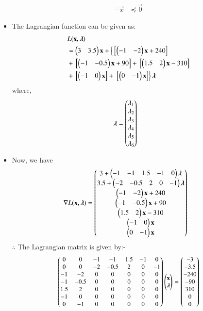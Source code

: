 \documentclass[journal,12pt,twocolumn]{IEEEtran}
\begin{document}
\begin{itemize}
\begin{align}
        \vec{-x} &\preceq \vec{0}
\end{align}
\item The Lagrangian function can be given as:
\begin{equation}
\begin{aligned}
    &L(\mathbf{x},\boldsymbol{\lambda}) \\ &= \begin{pmatrix}3 & 3.5\end{pmatrix}\mathbf{x}+\left\{{}\left[\begin{pmatrix}-1 & -2\end{pmatrix}\mathbf{x}+240\right]\right. \\ &+ {}\left[\begin{pmatrix}-1 & -0.5\end{pmatrix}\mathbf{x}+90\right] +{}\left[\begin{pmatrix}1.5 & 2\end{pmatrix}\mathbf{x}-310\right] \\ &+ {}\left[\begin{pmatrix}-1 & 0\end{pmatrix}\mathbf{x}\right] +\left.{}\left[\begin{pmatrix}0 & -1\end{pmatrix}\mathbf{x}\right]\right\}\boldsymbol{\lambda}
\end{aligned}
\end{equation}
where,
\begin{align}
    \boldsymbol{\lambda} &= \begin{pmatrix}\lambda_1 \\ \lambda_2 \\ \lambda_3 \\ \lambda_4 \\ \lambda_5 \\ \lambda_6\end{pmatrix}
\end{align}
\item Now, we have
\begin{align}
    \nabla L(\mathbf{x},\boldsymbol{\lambda}) &= \begin{pmatrix}3+ \begin{pmatrix}-1 & -1 & 1.5 & -1 & 0 \end{pmatrix}\boldsymbol{\lambda}\\ 3.5+\begin{pmatrix}-2 & -0.5 & 2 & 0 & -1\end{pmatrix}\boldsymbol{\lambda} \\ \begin{pmatrix}-1 & -2\end{pmatrix}\mathbf{x}+240 \\ \begin{pmatrix}-1 & -0.5\end{pmatrix}\mathbf{x}+90 \\ \begin{pmatrix}1.5 & 2\end{pmatrix}\mathbf{x}-310 \\ \begin{pmatrix}-1 & 0\end{pmatrix}\mathbf{x} \\ \begin{pmatrix}0 & -1\end{pmatrix}\mathbf{x}\end{pmatrix}
\end{align}
$\therefore$ The Lagrangian matrix is given by:-
\begin{align}
  \small{\myvec{0 & 0 & -1 & -1 & 1.5 & -1 & 0 \\ 0 & 0 & -2 & -0.5 & 2 & 0 & -1 \\ -1 & -2 & 0 & 0 & 0 & 0 & 0 \\ -1 & -0.5 & 0 & 0 & 0 & 0 & 0 \\ 1.5 & 2 & 0 & 0 & 0 & 0 & 0 \\ -1 & 0 & 0 & 0 & 0 & 0 & 0 \\ 0 & -1 & 0 & 0 & 0 & 0 & 0 }\myvec{\vec{x} \\ \boldsymbol{\lambda} }}= \small{\myvec{-3 \\ -3.5 \\ -240 \\ -90 \\ 310 \\ 0 \\0 }}

\end{align}
\end{itemize}
\end{document}
